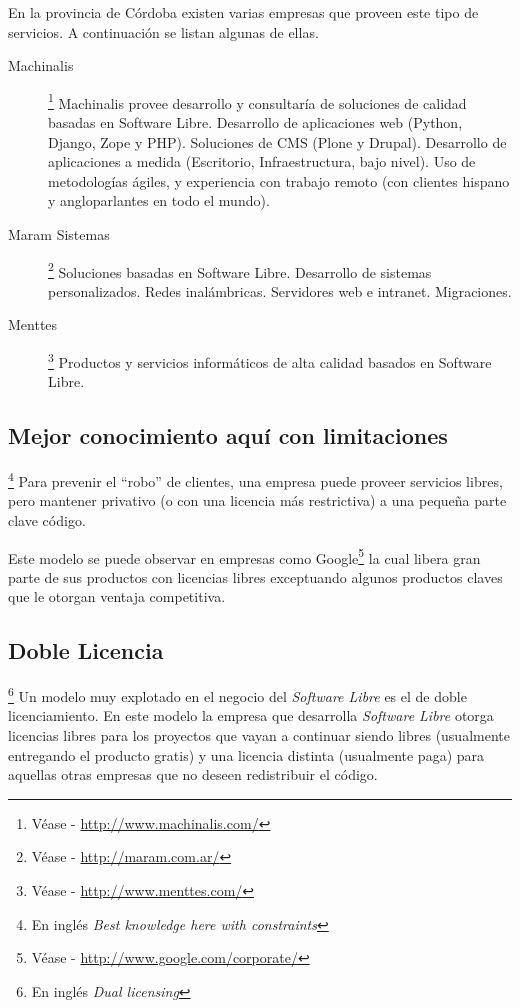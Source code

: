 En la provincia de C\'ordoba existen varias empresas que proveen este tipo de
servicios. A continuaci\'on se listan algunas de ellas.

\begin{description}
 \item[Machinalis]\footnote{V\'ease - \url{http://www.machinalis.com/}}
Machinalis provee desarrollo y consultar\'ia de soluciones de calidad basadas
en Software Libre. Desarrollo de aplicaciones web (Python, Django, Zope y PHP).
Soluciones de CMS (Plone y Drupal). Desarrollo de aplicaciones a medida
(Escritorio, Infraestructura, bajo nivel). Uso de metodolog\'ias \'agiles, y
experiencia con trabajo remoto (con clientes hispano y angloparlantes
en todo el mundo). 

\item[Maram Sistemas]\footnote{V\'ease - \url{http://maram.com.ar/}} Soluciones
basadas en Software Libre. Desarrollo de sistemas personalizados. Redes
inal\'ambricas. Servidores web e intranet. Migraciones.

\item[Menttes]\footnote{V\'ease - \url{http://www.menttes.com/}} Productos y
servicios inform\'aticos de alta calidad basados en Software Libre.
 \end{description}

\subsection{Mejor conocimiento aqu\'i con limitaciones}\footnote{En
ingl\'es \emph{Best knowledge here with constraints}}
%
Para prevenir el ``robo'' de clientes, una empresa puede proveer servicios
libres, pero mantener privativo (o con una licencia m\'as restrictiva) a una
peque\~na parte clave c\'odigo.\

Este modelo se puede observar en empresas como Google\footnote{V\'ease -
\url{http://www.google.com/corporate/}} la cual libera gran parte de sus
productos con licencias libres exceptuando algunos productos claves que le
otorgan ventaja competitiva.


\subsection{Doble Licencia}\footnote{En ingl\'es \emph{Dual licensing}}
%
Un modelo muy explotado en el negocio del \emph{Software Libre} es el de doble
licenciamiento. En este modelo la empresa que desarrolla \emph{Software
Libre} otorga licencias libres para los proyectos que vayan a continuar siendo
libres (usualmente entregando el producto gratis) y una licencia distinta
(usualmente paga) para aquellas otras empresas que no deseen redistribuir el
c\'odigo. \\

